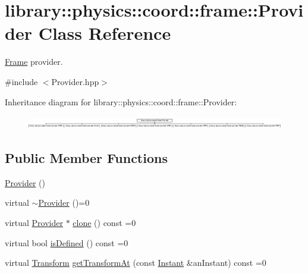 \hypertarget{classlibrary_1_1physics_1_1coord_1_1frame_1_1_provider}{}\section{library\+:\+:physics\+:\+:coord\+:\+:frame\+:\+:Provider Class Reference}
\label{classlibrary_1_1physics_1_1coord_1_1frame_1_1_provider}


\hyperlink{classlibrary_1_1physics_1_1coord_1_1_frame}{Frame} provider.  




{\ttfamily \#include $<$Provider.\+hpp$>$}

Inheritance diagram for library\+:\+:physics\+:\+:coord\+:\+:frame\+:\+:Provider\+:\begin{figure}[H]
\begin{center}
\leavevmode
\includegraphics[height=0.577617cm]{classlibrary_1_1physics_1_1coord_1_1frame_1_1_provider}
\end{center}
\end{figure}
\subsection*{Public Member Functions}
\begin{DoxyCompactItemize}
\item 
\hyperlink{classlibrary_1_1physics_1_1coord_1_1frame_1_1_provider_a51327e656332668ba3726d52d7a27f22}{Provider} ()
\item 
virtual \hyperlink{classlibrary_1_1physics_1_1coord_1_1frame_1_1_provider_a7683aa718a339d1bfc8658dc9509adaf}{$\sim$\+Provider} ()=0
\item 
virtual \hyperlink{classlibrary_1_1physics_1_1coord_1_1frame_1_1_provider}{Provider} $\ast$ \hyperlink{classlibrary_1_1physics_1_1coord_1_1frame_1_1_provider_ab8eee40c8ef4aee0b57bedf458f4934e}{clone} () const =0
\item 
virtual bool \hyperlink{classlibrary_1_1physics_1_1coord_1_1frame_1_1_provider_ae7cd093febf2b20f71400f9f79442774}{is\+Defined} () const =0
\item 
virtual \hyperlink{classlibrary_1_1physics_1_1coord_1_1_transform}{Transform} \hyperlink{classlibrary_1_1physics_1_1coord_1_1frame_1_1_provider_a796fd2dd337f1304a0e9acf573ce2550}{get\+Transform\+At} (const \hyperlink{classlibrary_1_1physics_1_1time_1_1_instant}{Instant} \&an\+Instant) const =0
\end{DoxyCompactItemize}


